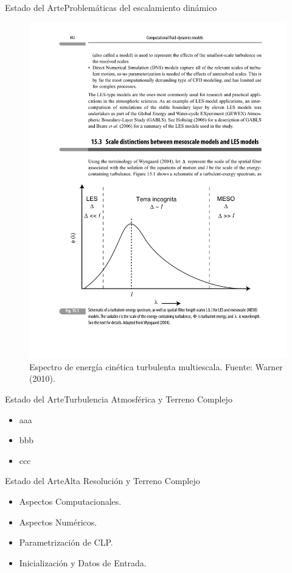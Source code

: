 \documentclass[mathserif]{beamer}
\begin{document}
\begin{frame}{Estado del Arte}{Problemáticas del escalamiento dinámico}
	\begin{figure}
		\centering
		\includegraphics[width=0.9\linewidth,trim={2cm 3.0cm 1.5cm 11.5cm},clip]{fig/02/terra_inc}
		\caption{Espectro de energía cinética turbulenta multiescala. Fuente: Warner (2010).}
		\label{fig:02_terra_inc}
	\end{figure}
\end{frame}

\begin{frame}{Estado del Arte}{Turbulencia Atmosférica y Terreno Complejo}
	\begin{itemize}
		\item aaa
		\item bbb
		\item ccc
	\end{itemize}
\end{frame}

\begin{frame}{Estado del Arte}{Alta Resolución y Terreno Complejo}
	\begin{itemize}
		\item Aspectos Computacionales.
		\item Aspectos Numéricos.
		\item Parametrización de CLP.
		\item Inicialización y Datos de Entrada.
	\end{itemize}
\end{frame}
\end{document}

